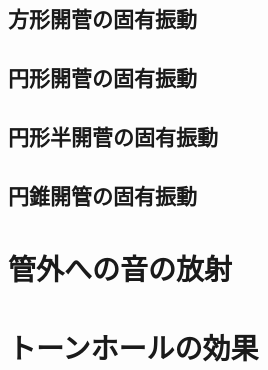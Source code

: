 \documentclass[a4paper]{ltjsarticle}
\begin{document}
\subsection{方形開菅の固有振動}

\subsection{円形開菅の固有振動}

\subsection{円形半開菅の固有振動}

\subsection{円錐開管の固有振動}


\section{管外への音の放射}


\section{トーンホールの効果}
\end{document}
